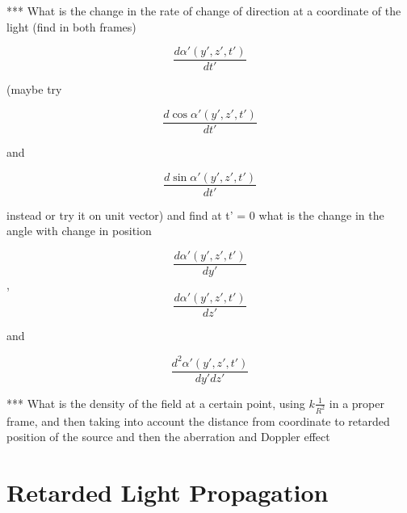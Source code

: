 *** What is the change in the rate of change of direction at a coordinate of the light (find in both frames)

\begin{equation}
	\frac{d\alpha{'}(y{'},z{'},t{'})}{dt{'}}
\end{equation}

(maybe try

\begin{equation}
	\frac{d\cos\alpha{'}(y{'},z{'},t{'})}{dt{'}}
\end{equation}

and

\begin{equation}
	\frac{d\sin\alpha{'}(y{'},z{'},t{'})}{dt{'}}
\end{equation}

instead or try it on unit vector) and find at {t{'}} = 0 what is the change in the angle with change in position

\begin{equation}
	\frac{d\alpha{'}(y{'},z{'},t{'})}{dy{'}}
\end{equation}
,
\begin{equation}
	\frac{d\alpha{'}(y{'},z{'},t{'})}{dz{'}}
\end{equation}

and

\begin{equation}
	\frac{d^2\alpha{'}(y{'},z{'},t{'})}{{dy{'}}{dz{'}}}
\end{equation}


*** What is the density of the field at a certain point, using $k \frac{1}{R^2}$ in a proper frame, and then taking into account the distance from coordinate to retarded position of the source and then the aberration and Doppler effect

\section{Retarded Light Propagation}\label{subsect: Retarded Light Propagation}

